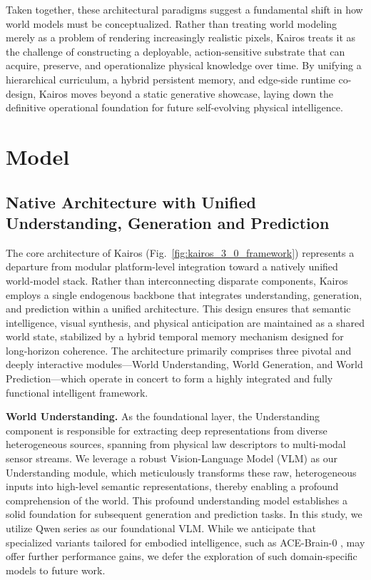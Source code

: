 \documentclass{llmxive}
\begin{document}
Taken together, these architectural paradigms suggest a fundamental shift in how world models must be conceptualized. Rather than treating world modeling merely as a problem of rendering increasingly realistic pixels, Kairos treats it as the challenge of constructing a deployable, action-sensitive substrate that can acquire, preserve, and operationalize physical knowledge over time. By unifying a hierarchical curriculum, a hybrid persistent memory, and edge-side runtime co-design, Kairos moves beyond a static generative showcase, laying down the definitive operational foundation for future self-evolving physical intelligence.











\section{Model}


\subsection{Native Architecture with Unified Understanding, Generation and Prediction}

The core architecture of Kairos (Fig.~\ref{fig:kairos_3_0_framework}) represents a departure from modular platform-level integration toward a natively unified world-model stack. Rather than interconnecting disparate components, Kairos employs a single endogenous backbone that integrates understanding, generation, and prediction within a unified architecture. This design ensures that semantic intelligence, visual synthesis, and physical anticipation are maintained as a shared world state, stabilized by a hybrid temporal memory mechanism designed for long-horizon coherence. The architecture primarily comprises three pivotal and deeply interactive modules—World Understanding, World Generation, and World Prediction—which operate in concert to form a highly integrated and fully functional intelligent framework.





\textbf{World Understanding.}
As the foundational layer, the Understanding component is responsible for extracting deep representations from diverse heterogeneous sources, spanning from physical law descriptors to multi-modal sensor streams. We leverage a robust Vision-Language Model (VLM) as our Understanding module, which meticulously transforms these raw, heterogeneous inputs into high-level semantic representations, thereby enabling a profound comprehension of the world. This profound understanding model establishes a solid foundation for subsequent generation and prediction tasks. In this study, we utilize Qwen series \cite{qwen2.5-VL,qwen3.5} as our foundational VLM. While we anticipate that specialized variants tailored for embodied intelligence, such as ACE-Brain-0 \cite{gong2026acebrain0spatialintelligenceshared}, may offer further performance gains, we defer the exploration of such domain-specific models to future work.
\end{document}
